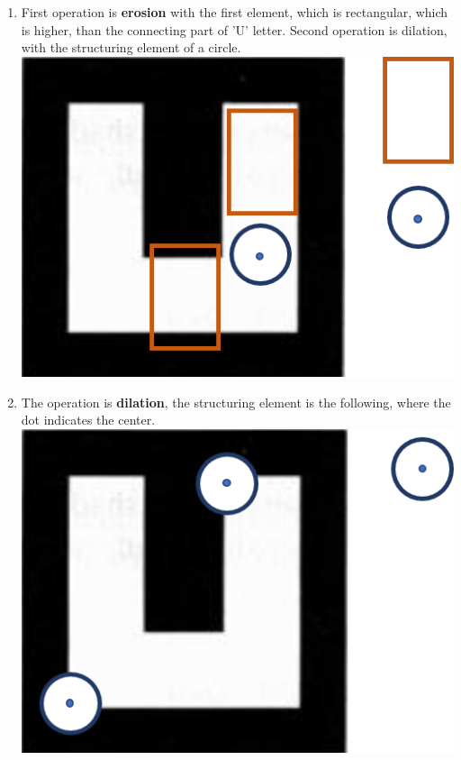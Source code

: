 \documentclass[a4paper]{iacas}
\begin{document}
\begin{enumerate}[label=(\alph*.)]
\item First operation is \textbf{erosion} with the first element, which is rectangular, which is higher, than the connecting part of 'U' letter. Second operation is dilation, with the structuring element of a circle.
\newline
\newline
\includegraphics{imgs/q3_13.png}
\item The operation is \textbf{dilation}, the structuring element is the following, where the dot indicates the center.
\newline
\newline
\includegraphics{imgs/q3_14.png}


\end{enumerate}
\end{document}
